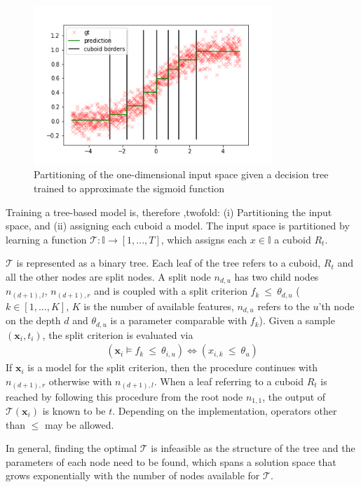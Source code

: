     \begin{figure}[H]
        \centering
        \includegraphics[width=9cm]{images/ml_basics/sigmoid_depth3.png}\caption{Partitioning of the one-dimensional input space given a decision tree trained to approximate the sigmoid function}
        \label{fig:sigmoid_partitioning_decision_tree}
    \end{figure}
    
    Training a tree-based model is, therefore ,twofold: (i) Partitioning the input space, and (ii) assigning each cuboid a model. The input space is partitioned by learning a function $\mathcal{T}: \mathbb{I} \to [1,...,T]$, which assigns each $x \in \mathbb{I}$ a cuboid $R_t$. 

    $\mathcal{T}$ is represented as a binary tree. Each leaf of the tree refers to a cuboid, $R_t$ and all the other nodes are split nodes. A split node $n_{d,u}$ has two child nodes $n_{(d+1),l}$, $n_{(d+1),r}$ and is coupled with a split criterion $f_k~\leq~ \theta_{d,u}$ ($k \in [1,...,K]$, $K$ is the number of available features, $n_{d,u}$ refers to the $u$'th node on the depth $d$ and $\theta_{d,u}$ is a parameter comparable with $f_k$). 
    Given a sample $(\mathbf{x}_i, t_i)$,  the split criterion is evaluated via 
    \begin{gather}
        (\mathbf{x}_i \models f_k~\leq~\theta_{i,u}) \Longleftrightarrow (x_{i,k} ~\leq~\theta_u) \label{formular_split_criterion}
    \end{gather}
    If $\mathbf{x}_i$ is a model for the split criterion, then the procedure continues with $n_{(d+1),r}$ otherwise with $n_{(d+1),l}$. When a leaf referring to a cuboid $R_t$ is reached by following this procedure from the root node $n_{1,1}$, the output of $\mathcal{T}(\mathbf{x}_i)$ is known to be $t$. Depending on the implementation, operators other than $\leq$ may be allowed.

    In general, finding the optimal $\mathcal{T}$ is infeasible as the structure of the tree and the parameters of each node need to be found, which spans a solution space that grows exponentially with the number of nodes available for $\mathcal{T}$.
    
